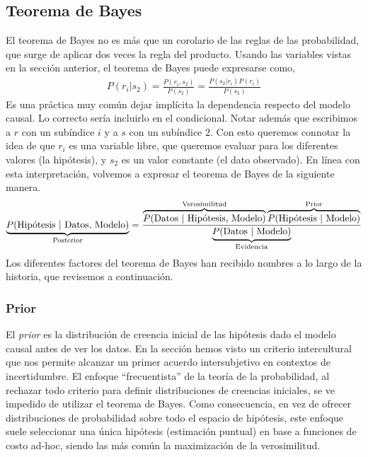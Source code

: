 \documentclass[a4paper,11pt]{book}
\theoremstyle{definition}
\begin{document}
\subsection{Teorema de Bayes}

El teorema de Bayes no es más que un corolario de las reglas de las probabilidad, que surge de aplicar dos veces la regla del producto.
%
Usando las variables vistas en la sección anterior, el teorema de Bayes puede expresarse como,
%
\begin{equation}
\begin{split}
P(r_i|s_2) = \frac{P(r_i, s_2)}{P(s_2)} = \frac{P(s_2|r_i)P(r_i)}{P(s_2)}
\end{split}
\end{equation}
%
Es una práctica muy común dejar implícita la dependencia respecto del modelo causal.
%
Lo correcto sería incluirlo en el condicional.
%
Notar además que escribimos a $r$ con un subíndice $i$ y a $s$ con un subíndice $2$.
%
Con esto queremos connotar la idea de que $r_i$ es una variable libre, que queremos evaluar para los diferentes valores (la hipótesis), y $s_2$ es un valor constante (el dato observado).
%
En línea con esta interpretación, volvemos a expresar el teorema de Bayes de la siguiente manera.
%
\begin{equation}\label{eq:teorema_bayes}
\underbrace{P(\text{Hipótesis }|\text{ Datos, Modelo})}_{\text{\scriptsize Posterior}} = \frac{\overbrace{P(\text{Datos }|\text{ Hipótesis, Modelo})}^{\text{\scriptsize Verosimilitud}} \overbrace{P(\text{Hipótesis }|\text{ Modelo})}^{\text{\scriptsize Prior}} }{\underbrace{P(\text{Datos }|\text{ Modelo})}_{\text{\scriptsize Evidencia}}}
\end{equation}
%
Los diferentes factores del teorema de Bayes han recibido nombres a lo largo de la historia, que revisemos a continuación.

\subsubsection{Prior}

El \emph{prior} es la distribución de creencia inicial de las hipótesis dado el modelo causal antes de ver los datos.
%
En la sección \emph{} hemos visto un criterio intercultural que nos permite alcanzar un primer acuerdo intersubjetivo en contextos de incertidumbre.
%
El enfoque ``frecuentista'' de la teoría de la probabilidad, al rechazar todo criterio para definir distribuciones de creencias iniciales, se ve impedido de utilizar el teorema de Bayes.
%
Como consecuencia, en vez de ofrecer distribuciones de probabilidad sobre todo el espacio de hipótesis, este enfoque suele seleccionar una única hipótesis (estimación puntual) en base a funciones de costo ad-hoc, siendo las más común la maximización de la verosimilitud.
\end{document}
